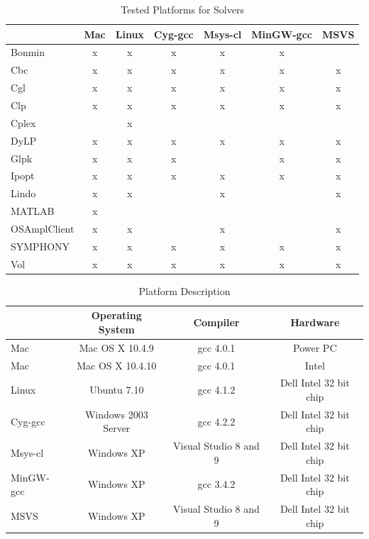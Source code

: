 \documentclass[11pt]{article}
\renewcommand{\_}{{\char"5F}}
\renewcommand{\{}{{\char"7B}}
\renewcommand{\}}{{\char"7D}}
\renewcommand{\^}{{\char"0D}}
\renewcommand{\'}{{\char"0D}}
\newif\ifknitro \knitrofalse    %
\begin{document}
\begin{enumerate}[Step 1:]
\begin{table}
\caption{Tested Platforms for Solvers}
\centering
\label{table:testedplatforms}
\vskip 8pt
 \begin{tabular}{l|c|c|c|c|c|c|}
 &Mac&Linux&Cyg-gcc&Msys-cl&MinGW-gcc&MSVS \\ \hline
Bonmin       &x&x&x&x&x&  \\ \hline
Cbc          &x&x&x&x&x&x \\ \hline
Cgl          &x&x&x&x&x&x \\ \hline
Clp          &x&x&x&x&x&x \\ \hline
Cplex        & &x& & & &  \\ \hline
DyLP         &x&x&x&x&x&x \\ \hline
Glpk         &x&x&x& &x&x \\ \hline
Ipopt        &x&x&x&x&x&x \\ \hline
\ifknitro
Knitro       &x&x& & & &  \\ \hline
\fi
Lindo        &x&x& &x& &x \\ \hline
MATLAB       &x& & & & &  \\ \hline
OSAmplClient &x&x& &x& &x \\ \hline
SYMPHONY     &x&x&x&x&x&x \\ \hline
Vol          &x&x&x&x&x&x \\ \hline
\end{tabular}
\end{table}


 \begin{table}
\caption{Platform Description}
\centering
\label{table:platformdescription}
\vskip 8pt
 \begin{tabular}{l|c|c|c|}
 & {\bf Operating System} & {\bf Compiler} & {\bf  Hardware} \\ \hline
 Mac &Mac OS X 10.4.9&gcc 4.0.1&Power PC \\   \hline
  Mac &Mac OS X 10.4.10&gcc 4.0.1&Intel \\   \hline
 Linux &Ubuntu  7.10 &gcc 4.1.2& Dell Intel 32 bit chip\\ \hline
 Cyg-gcc &Windows 2003 Server&gcc 4.2.2& Dell Intel 32 bit chip \\ \hline
 Msys-cl &Windows XP&Visual Studio 8 and 9 &Dell Intel 32 bit chip \\ \hline
 MinGW-gcc &Windows XP&gcc 3.4.2&Dell Intel 32 bit chip \\ \hline
 MSVS &Windows XP&Visual Studio 8 and 9 &Dell Intel 32 bit chip \\ \hline
\end{tabular}
\end{table}



\end{enumerate}
\end{document}
